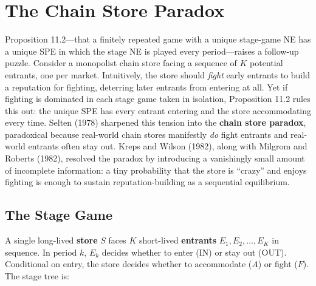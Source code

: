 \section{The Chain Store Paradox}

Proposition 11.2---that a finitely repeated game with a unique stage-game NE has a unique SPE in which the stage NE is played every period---raises a follow-up puzzle. Consider a monopolist chain store facing a sequence of $K$ potential entrants, one per market. Intuitively, the store should \emph{fight} early entrants to build a reputation for fighting, deterring later entrants from entering at all. Yet if fighting is dominated in each stage game taken in isolation, Proposition 11.2 rules this out: the unique SPE has every entrant entering and the store accommodating every time. Selten (1978) sharpened this tension into the \textbf{chain store paradox}, paradoxical because real-world chain stores manifestly \emph{do} fight entrants and real-world entrants often stay out. Kreps and Wilson (1982), along with Milgrom and Roberts (1982), resolved the paradox by introducing a vanishingly small amount of incomplete information: a tiny probability that the store is ``crazy'' and enjoys fighting is enough to sustain reputation-building as a sequential equilibrium.


\subsection{The Stage Game}

A single long-lived \textbf{store} $S$ faces $K$ short-lived \textbf{entrants} $E_1, E_2, \ldots, E_K$ in sequence. In period $k$, $E_k$ decides whether to enter (IN) or stay out (OUT). Conditional on entry, the store decides whether to accommodate ($A$) or fight ($F$). The stage tree is:

